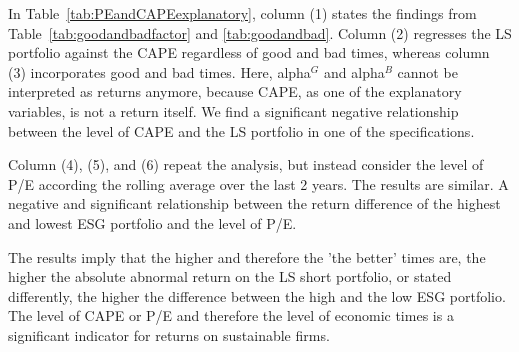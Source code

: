 \documentclass[11pt]{article}
\begin{document}
In Table~\ref{tab:PEandCAPEexplanatory}, column (1) states the findings from Table~\ref{tab:goodandbadfactor} and \ref{tab:goodandbad}. Column (2) regresses the LS portfolio against the CAPE regardless of good and bad times, whereas column (3) incorporates good and bad times. Here, alpha$^G$ and alpha$^B$ cannot be interpreted as returns anymore, because CAPE, as one of the explanatory variables, is not a return itself. We find a significant negative relationship between the level of CAPE and the LS portfolio in one of the specifications.

Column (4), (5), and (6) repeat the analysis, but instead consider the level of P/E according the rolling average over the last 2 years. The results are similar. A negative and significant relationship between the return difference of the highest and lowest ESG portfolio and the level of P/E. 

The results imply that the higher and therefore the 'the better' times are, the higher the absolute abnormal return on the LS short portfolio, or stated differently, the higher the difference between the high and the low ESG portfolio. The level of CAPE or P/E and therefore the level of economic times is a significant indicator for returns on sustainable firms. 
\end{document}
